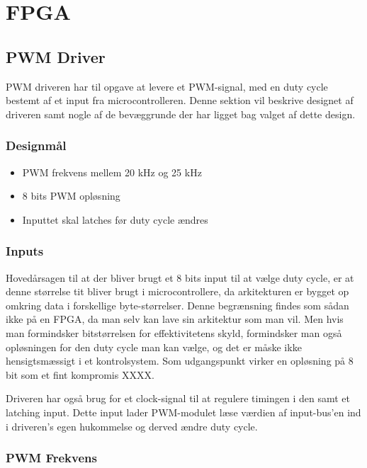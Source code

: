 \section{FPGA}

\subsection{PWM Driver}

PWM driveren har til opgave at levere et PWM-signal, med en duty cycle bestemt af et input fra microcontrolleren. Denne sektion vil beskrive designet af driveren samt nogle af de bevæggrunde der har ligget bag valget af dette design.

\subsubsection{Designmål}

\begin{itemize}

\item PWM frekvens mellem 20 kHz og 25 kHz
\item 8 bits PWM opløsning
\item Inputtet skal latches før duty cycle ændres

\end{itemize}

\subsubsection{Inputs}

Hovedårsagen til at der bliver brugt et 8 bits input til at vælge duty cycle, er at denne størrelse tit bliver brugt i microcontrollere, da arkitekturen er bygget op omkring data i forskellige byte-størrelser. Denne begrænsning findes som sådan ikke på en FPGA, da man selv kan lave sin arkitektur som man vil. Men hvis man formindsker bitstørrelsen for effektivitetens skyld, formindsker man også opløsningen for den duty cycle man kan vælge, og det er måske ikke hensigtsmæssigt i et kontrolsystem. Som udgangspunkt virker en opløsning på 8 bit som et fint kompromis XXXX.

Driveren har også brug for et clock-signal til at regulere timingen i den samt et latching input. Dette input lader PWM-modulet læse værdien af input-bus'en ind i driveren's egen hukommelse og derved ændre duty cycle.

\subsubsection{PWM Frekvens}

